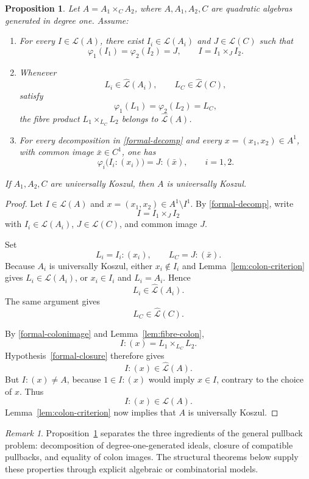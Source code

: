 \documentclass[12pt]{amsart}
\theoremstyle{plain}
\newtheorem{proposition}[theorem]{Proposition}
\theoremstyle{definition}
\theoremstyle{remark}
\newtheorem{remark}[theorem]{Remark}
\numberwithin{equation}{section}
\begin{document}
\begin{proposition}
\label{prop:formal-criterion}
Let \(A=A_1\times_C A_2\), where \(A,A_1,A_2,C\) are quadratic
algebras generated in degree one. Assume:
\begin{enumerate}[label=\textnormal{(\roman*)}]
\item\label{formal-decomp}
For every \(I\in\mathcal L(A)\), there exist
\(I_i\in\mathcal L(A_i)\) and \(J\in\mathcal L(C)\) such that
\[
\varphi_1(I_1)=\varphi_2(I_2)=J,
\qquad
I=I_1\times_JI_2.
\]

\item\label{formal-closure}
Whenever
\[
L_i\in\widehat{\mathcal L}(A_i),
\qquad
L_C\in\widehat{\mathcal L}(C),
\]
satisfy
\[
\varphi_1(L_1)=\varphi_2(L_2)=L_C,
\]
the fibre product \(L_1\times_{L_C}L_2\) belongs to
\(\widehat{\mathcal L}(A)\).

\item\label{formal-colonimage}
For every decomposition in \ref{formal-decomp} and every
\(x=(x_1,x_2)\in A^1\), with common image
\(\bar x\in C^1\), one has
\[
\varphi_i\bigl(I_i:(x_i)\bigr)=J:(\bar x),
\qquad i=1,2.
\]
\end{enumerate}
If \(A_1,A_2,C\) are universally Koszul, then \(A\) is universally
Koszul.
\end{proposition}

\begin{proof}
Let \(I\in\mathcal L(A)\) and
\(x=(x_1,x_2)\in A^1\setminus I^1\). By
\ref{formal-decomp}, write
\[
I=I_1\times_JI_2
\]
with \(I_i\in\mathcal L(A_i)\), \(J\in\mathcal L(C)\), and common
image \(J\).

Set
\[
L_i=I_i:(x_i),
\qquad
L_C=J:(\bar x).
\]
Because \(A_i\) is universally Koszul, either
\(x_i\notin I_i\) and Lemma~\ref{lem:colon-criterion} gives
\(L_i\in\mathcal L(A_i)\), or \(x_i\in I_i\) and
\(L_i=A_i\). Hence
\[
L_i\in\widehat{\mathcal L}(A_i).
\]
The same argument gives
\[
L_C\in\widehat{\mathcal L}(C).
\]

By \ref{formal-colonimage} and Lemma~\ref{lem:fibre-colon},
\[
I:(x)=L_1\times_{L_C}L_2.
\]
Hypothesis~\ref{formal-closure} therefore gives
\[
I:(x)\in\widehat{\mathcal L}(A).
\]
But \(I:(x)\neq A\), because
\(1\in I:(x)\) would imply \(x\in I\), contrary to the choice of
\(x\). Thus
\[
I:(x)\in\mathcal L(A).
\]
Lemma~\ref{lem:colon-criterion} now implies that \(A\) is universally
Koszul.
\end{proof}

\begin{remark}
Proposition~\ref{prop:formal-criterion} separates the three ingredients of
the general pullback problem: decomposition of degree-one-generated ideals,
closure of compatible pullbacks, and equality of colon images. The
structural theorems below supply these properties through explicit algebraic
or combinatorial models.
\end{remark}
\end{document}
